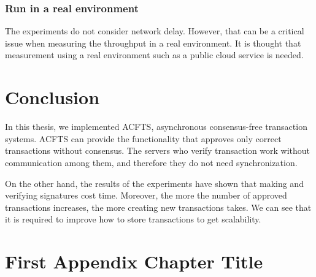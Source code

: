\documentclass[a4paper, oneside]{discothesis}
\begin{document}
\subsection{Run in a real environment}
The experiments do not consider network delay.
However, that can be a critical issue when measuring the throughput in a real environment.
It is thought that measurement using a real environment such as a public cloud service is needed.

\chapter{Conclusion}
In this thesis, we implemented ACFTS, asynchronous consensus-free transaction systems.
ACFTS can provide the functionality that approves only correct transactions without consensus.
The servers who verify transaction work without communication among them,
and therefore they do not need synchronization.

On the other hand, the results of the experiments have shown that
making and verifying signatures cost time.
Moreover, the more the number of approved transactions increases,
the more creating new transactions takes.
We can see that it is required to improve how to store transactions to get scalability.







\appendix
\chapter{First Appendix Chapter Title}
\end{document}
